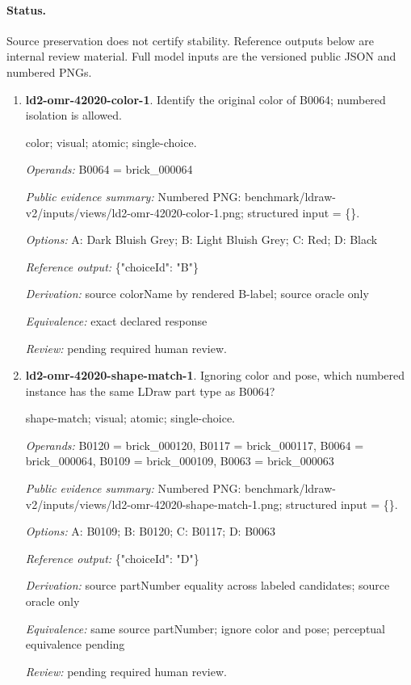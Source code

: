 \paragraph{Status.}Source preservation does not certify stability. Reference outputs below are internal review material. Full model inputs are the versioned public JSON and numbered PNGs.
\begin{enumerate}
\item \textbf{ld2-omr-42020-color-1}. Identify the original color of B0064; numbered isolation is allowed.
\par{\small color; visual; atomic; single-choice.\par\textit{Operands:} B0064 = brick\_000064\par\textit{Public evidence summary:} Numbered PNG: benchmark/ldraw-v2/inputs/views/ld2-omr-42020-color-1.png; structured input = \{\}.\par\textit{Options:} A: Dark Bluish Grey; B: Light Bluish Grey; C: Red; D: Black\par\textit{Reference output:} \{"choiceId": "B"\}\par\textit{Derivation:} source colorName by rendered B-label; source oracle only\par\textit{Equivalence:} exact declared response\par\textit{Review:} pending required human review.}
\item \textbf{ld2-omr-42020-shape-match-1}. Ignoring color and pose, which numbered instance has the same LDraw part type as B0064?
\par{\small shape-match; visual; atomic; single-choice.\par\textit{Operands:} B0120 = brick\_000120, B0117 = brick\_000117, B0064 = brick\_000064, B0109 = brick\_000109, B0063 = brick\_000063\par\textit{Public evidence summary:} Numbered PNG: benchmark/ldraw-v2/inputs/views/ld2-omr-42020-shape-match-1.png; structured input = \{\}.\par\textit{Options:} A: B0109; B: B0120; C: B0117; D: B0063\par\textit{Reference output:} \{"choiceId": "D"\}\par\textit{Derivation:} source partNumber equality across labeled candidates; source oracle only\par\textit{Equivalence:} same source partNumber; ignore color and pose; perceptual equivalence pending\par\textit{Review:} pending required human review.}

\end{enumerate}
